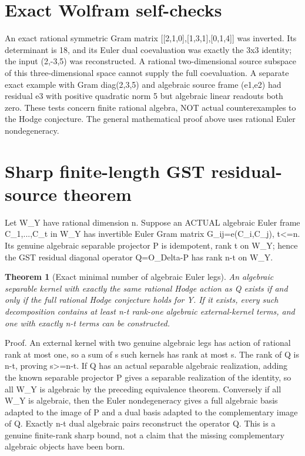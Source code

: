 \documentclass{article}
\newtheorem{theorem}{Theorem}
\begin{document}
\section*{Exact Wolfram self-checks}
An exact rational symmetric Gram matrix
[[2,1,0],[1,3,1],[0,1,4]]
was inverted. Its determinant is 18,
and its Euler dual coevaluation was
exactly the 3x3 identity; the input
(2,-3,5) was reconstructed. A rational
two-dimensional source subspace of this
three-dimensional space cannot supply
the full coevaluation. A separate exact
example with Gram diag(2,3,5) and
algebraic source frame (e1,e2)
had residual e3 with positive quadratic
norm 5 but algebraic linear readouts
both zero. These tests concern
finite rational algebra, NOT actual
counterexamples to the Hodge conjecture.
The general mathematical proof above
uses rational Euler nondegeneracy.


\section*{Sharp finite-length GST residual-source theorem}
Let W_Y have rational dimension n.
Suppose an ACTUAL algebraic Euler frame
C_1,...,C_t in W_Y has invertible Euler Gram
matrix G_ij=e(C_i,C_j), t<=n.
Its genuine algebraic separable projector P
is idempotent, rank t on W_Y; hence the
GST residual diagonal operator
Q=O_Delta-P has rank n-t on W_Y.

\begin{theorem}[Exact minimal number of algebraic Euler legs]
An algebraic separable kernel with exactly
the same rational Hodge action as Q
exists if and only if the full rational
Hodge conjecture holds for Y.
If it exists, every such decomposition
contains at least n-t rank-one algebraic
external-kernel terms, and one with exactly
n-t terms can be constructed.
\end{theorem}
\noindent Proof.
An external kernel with two genuine
algebraic legs has action of rational
rank at most one, so a sum of s such
kernels has rank at most s.
The rank of Q is n-t, proving
s>=n-t. If Q has an actual separable
algebraic realization, adding the
known separable projector P gives
a separable realization of the identity,
so all W_Y is algebraic by the
preceding equivalence theorem.
Conversely if all W_Y is algebraic,
then the Euler nondegeneracy gives a
full algebraic basis adapted to the
image of P and a dual basis adapted to
the complementary image of Q. Exactly
n-t dual algebraic pairs reconstruct
the operator Q. This is a genuine
finite-rank sharp bound, not a claim
that the missing complementary
algebraic objects have been born.
\end{document}
